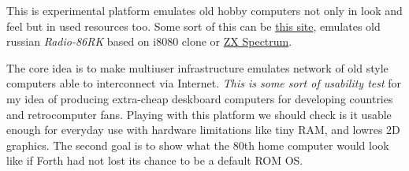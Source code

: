 {}\label{uweb}

This is experimental platform emulates old hobby computers not only in look and
feel but in used resources too. Some sort of this can be
\href{http://rk86.ru/}{this site}, emulates old russian \emph{Radio-86RK} based
on i8080 clone or \href{http://jsspeccy.zxdemo.org}{ZX Spectrum}.

The core idea is to make multiuser infrastructure emulates network of old style computers able to interconnect via
Internet. \emph{This is some sort of usability test} for my idea of producing
extra-cheap deskboard computers for developing countries and retrocomputer
fans. Playing with this platform we should check is it usable enough for
everyday use with hardware limitations like tiny RAM, and lowres 2D graphics.
The second goal is to show what the 80th home computer would look like if Forth
had not lost its chance to be a default ROM OS.
